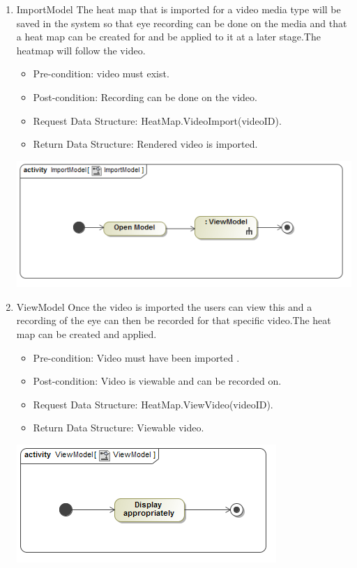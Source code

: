 		\begin{enumerate}
			\item{ImportModel}
			\newline
			The heat map that is imported for a video media type will be saved in the system so that eye recording can be done on the media and that a heat map can be created for and be applied to it at a later stage.The heatmap will follow the video.
			\begin{itemize}
				\item Pre-condition: video must exist.
				\item Post-condition: Recording can be done on the video.
				\item Request Data Structure: HeatMap.VideoImport(videoID).
				\item Return Data Structure: Rendered video is imported.
			\end{itemize}
			
			\includegraphics[scale=0.5]{Diagrams/Activity_Diagram__ImportModel__ImportModel.png}

			\item{ViewModel}
Once the video is imported the users can view this and a recording of the eye can then be recorded for that specific video.The heat map can be created and applied.
			\begin{itemize}
				\item Pre-condition: Video must have been imported .
				\item Post-condition: Video is viewable and can be recorded on.
				\item Request Data Structure: HeatMap.ViewVideo(videoID).
				\item Return Data Structure: Viewable video.
			\end{itemize}
			
			\includegraphics[scale=0.5]{Diagrams/Activity_Diagram__ViewModel__ViewModel.png}


\end{enumerate}
